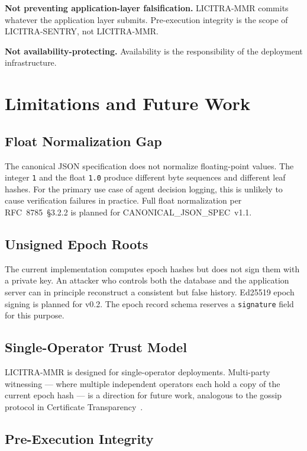 \documentclass[sigconf,natbib=false]{acmart}
\begin{document}
\textbf{Not preventing application-layer falsification.} LICITRA-MMR
commits whatever the application layer submits. Pre-execution integrity is
the scope of LICITRA-SENTRY, not LICITRA-MMR.

\textbf{Not availability-protecting.} Availability is the responsibility of
the deployment infrastructure.

\section{Limitations and Future Work}
\label{sec:limitations}

\subsection{Float Normalization Gap}

The canonical JSON specification does not normalize floating-point values.
The integer \texttt{1} and the float \texttt{1.0} produce different byte
sequences and different leaf hashes. For the primary use case of agent
decision logging, this is unlikely to cause verification failures in
practice. Full float normalization per RFC~8785~\S3.2.2 is planned for
CANONICAL\_JSON\_SPEC~v1.1.

\subsection{Unsigned Epoch Roots}

The current implementation computes epoch hashes but does not sign them
with a private key. An attacker who controls both the database and the
application server can in principle reconstruct a consistent but false
history. Ed25519 epoch signing is planned for v0.2. The epoch record
schema reserves a \texttt{signature} field for this purpose.

\subsection{Single-Operator Trust Model}

LICITRA-MMR is designed for single-operator deployments. Multi-party
witnessing --- where multiple independent operators each hold a copy of the
current epoch hash --- is a direction for future work, analogous to the
gossip protocol in Certificate Transparency~\cite{laurie2013}.

\subsection{Pre-Execution Integrity}
\end{document}
